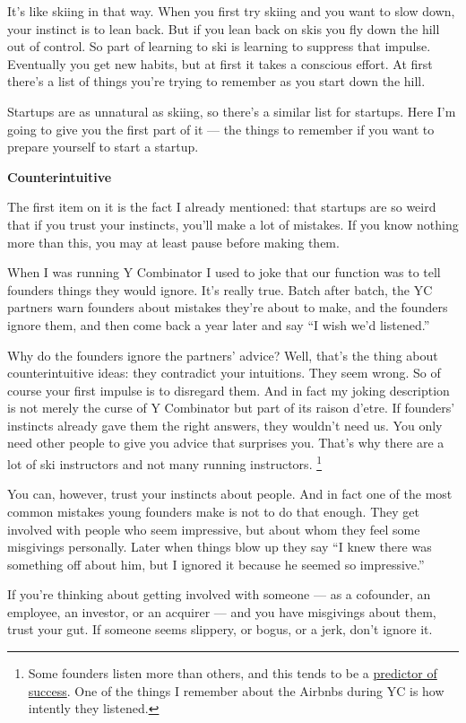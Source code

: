 \documentclass[12pt]{book}
\begin{document}
It's like skiing in that way. When you first try skiing and you want to
slow down, your instinct is to lean back. But if you lean back on skis
you fly down the hill out of control. So part of learning to ski is
learning to suppress that impulse. Eventually you get new habits, but at
first it takes a conscious effort. At first there's a list of things
you're trying to remember as you start down the hill.

Startups are as unnatural as skiing, so there's a similar list for
startups. Here I'm going to give you the first part of it --- the things
to remember if you want to prepare yourself to start a startup.

\textbf{Counterintuitive}

The first item on it is the fact I already mentioned: that startups are
so weird that if you trust your instincts, you'll make a lot of
mistakes. If you know nothing more than this, you may at least pause
before making them.

When I was running Y Combinator I used to joke that our function was to
tell founders things they would ignore. It's really true. Batch after
batch, the YC partners warn founders about mistakes they're about to
make, and the founders ignore them, and then come back a year later and
say ``I wish we'd listened.''

Why do the founders ignore the partners' advice? Well, that's the thing
about counterintuitive ideas: they contradict your intuitions. They seem
wrong. So of course your first impulse is to disregard them. And in fact
my joking description is not merely the curse of Y Combinator but part
of its raison d'etre. If founders' instincts already gave them the right
answers, they wouldn't need us. You only need other people to give you
advice that surprises you. That's why there are a lot of ski instructors
and not many running instructors. \footnote{Some founders listen more than others, and this tends to be a
\href{word.html}{predictor of success}. One of the things I remember
about the Airbnbs during YC is how intently they listened.}

You can, however, trust your instincts about people. And in fact one of
the most common mistakes young founders make is not to do that enough.
They get involved with people who seem impressive, but about whom they
feel some misgivings personally. Later when things blow up they say ``I
knew there was something off about him, but I ignored it because he
seemed so impressive.''

If you're thinking about getting involved with someone --- as a
cofounder, an employee, an investor, or an acquirer --- and you have
misgivings about them, trust your gut. If someone seems slippery, or
bogus, or a jerk, don't ignore it.
\end{document}

